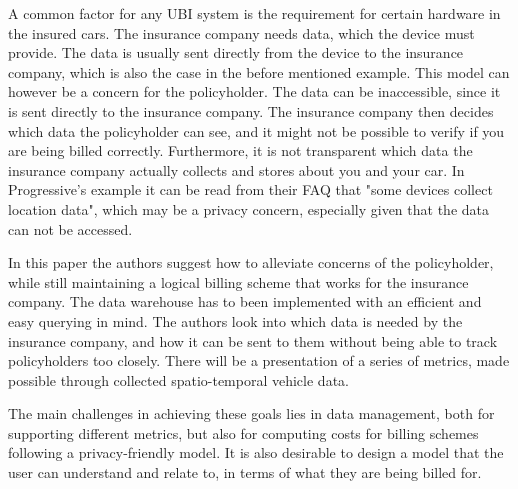 A common factor for any UBI system is the requirement for certain hardware in the insured cars. The insurance company needs data, which the device must provide. The data is usually sent directly from the device to the insurance company, which is also the case in the before mentioned example. This model can however be a concern for the policyholder. The data can be inaccessible, since it is sent directly to the insurance company. The insurance company then decides which data the policyholder can see, and it might not be possible to verify if you are being billed correctly. Furthermore, it is not transparent which data the insurance company actually collects and stores about you and your car. In Progressive's example it can be read from their FAQ that "some devices collect location data", which may be a privacy concern, especially given that the data can not be accessed.

In this paper the authors suggest how to alleviate concerns of the policyholder, while still maintaining a logical billing scheme that works for the insurance company. The data warehouse has to been implemented with an efficient and easy querying in mind. The authors look into which data is needed by the insurance company, and how it can be sent to them without being able to track policyholders too closely. There will be a presentation of a series of metrics, made possible through collected spatio-temporal vehicle data.

The main challenges in achieving these goals lies in data management, both for supporting different metrics, but also for computing costs for billing schemes following a privacy-friendly model. It is also desirable to design a model that the user can understand and relate to, in terms of what they are being billed for.
